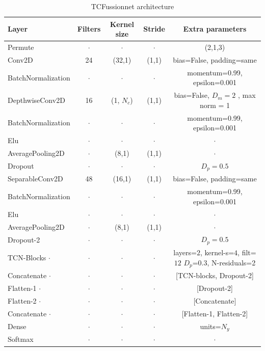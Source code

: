\begin{table}[h!]
\caption{TCFussionnet architecture}\label{table:tcfnet}
\centering
\begin{tabular}{l|c|c|c|c}
\hline
\textbf{Layer} & \textbf{Filters} & \textbf{Kernel size} & \textbf{Stride} & \textbf{Extra parameters}\\
\hline
Permute & $\cdot$ & $\cdot$ & $\cdot$ & (2,1,3)\\
Conv2D & 24 & (32,1) & (1,1) & bias=False, padding=same \\
BatchNormalization & $\cdot$ & $\cdot$ & $\cdot$ & momentum=0.99, epsilon=0.001\\ 
\hline
DepthwiseConv2D & 16 & (1, $N_c$) & (1,1) & bias=False, $D_m= 2$ , max norm = 1  \\ 
BatchNormalization & $\cdot$ & $\cdot$ & $\cdot$ & momentum=0.99, epsilon=0.001\\ 
Elu & $\cdot$ & $\cdot$ & $\cdot$ & $\cdot$\\ 
AveragePooling2D & $\cdot$ & (8,1) & (1,1) & $\cdot$ \\ 
Dropout & $\cdot$ & $\cdot$ & $\cdot$ & $D_p = 0.5$\\
\hline
SeparableConv2D & 48 & (16,1) & (1,1) & bias=False, padding=same\\
BatchNormalization & $\cdot$ & $\cdot$ & $\cdot$ & momentum=0.99, epsilon=0.001\\
Elu & $\cdot$ & $\cdot$ & $\cdot$& $\cdot$\\
AveragePooling2D & $\cdot$ &(8,1) & (1,1)& $\cdot$\\
Dropout-2 & $\cdot$ & $\cdot$ & $\cdot$ & $D_p = 0.5$\\
\hline
TCN-Blocks $\cdot$ & $\cdot$ & $\cdot$ & $\cdot$ & layers=$2$, kernel-s=$4$, filt=$12$ $D_p$=$0.3$, N-residuals=2 \\
Concatenate $\cdot$ & $\cdot$ & $\cdot$ & $\cdot$ & [TCN-blocks, Dropout-2] \\
\hline
Flatten-1 $\cdot$ & $\cdot$ & $\cdot$ & $\cdot$ & [Dropout-2] \\
Flatten-2 $\cdot$ & $\cdot$ & $\cdot$ & $\cdot$ &  [Concatenate] \\
Concatenate $\cdot$ & $\cdot$ & $\cdot$ & $\cdot$ & [Flatten-1, Flatten-2] \\
\hline
Dense & $\cdot$ & $\cdot$ & $\cdot$ & units=$N_y$\\
Softmax & $\cdot$ & $\cdot$ & $\cdot$ & $\cdot$\\
\hline
\end{tabular}
\end{table}

